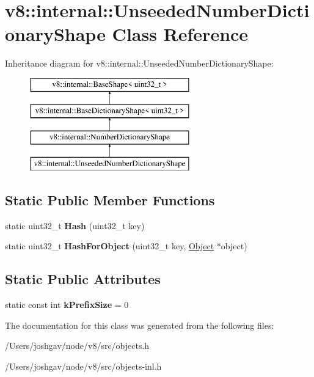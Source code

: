 \hypertarget{classv8_1_1internal_1_1_unseeded_number_dictionary_shape}{}\section{v8\+:\+:internal\+:\+:Unseeded\+Number\+Dictionary\+Shape Class Reference}
\label{classv8_1_1internal_1_1_unseeded_number_dictionary_shape}
Inheritance diagram for v8\+:\+:internal\+:\+:Unseeded\+Number\+Dictionary\+Shape\+:\begin{figure}[H]
\begin{center}
\leavevmode
\includegraphics[height=4.000000cm]{classv8_1_1internal_1_1_unseeded_number_dictionary_shape}
\end{center}
\end{figure}
\subsection*{Static Public Member Functions}
\begin{DoxyCompactItemize}
\item 
static uint32\+\_\+t {\bfseries Hash} (uint32\+\_\+t key)\hypertarget{classv8_1_1internal_1_1_unseeded_number_dictionary_shape_aa263aeb1e0592f9a83df6b3347adbf03}{}\label{classv8_1_1internal_1_1_unseeded_number_dictionary_shape_aa263aeb1e0592f9a83df6b3347adbf03}

\item 
static uint32\+\_\+t {\bfseries Hash\+For\+Object} (uint32\+\_\+t key, \hyperlink{classv8_1_1internal_1_1_object}{Object} $\ast$object)\hypertarget{classv8_1_1internal_1_1_unseeded_number_dictionary_shape_afdf69967c4a50a70d54b2b767b54fd21}{}\label{classv8_1_1internal_1_1_unseeded_number_dictionary_shape_afdf69967c4a50a70d54b2b767b54fd21}

\end{DoxyCompactItemize}
\subsection*{Static Public Attributes}
\begin{DoxyCompactItemize}
\item 
static const int {\bfseries k\+Prefix\+Size} = 0\hypertarget{classv8_1_1internal_1_1_unseeded_number_dictionary_shape_ab455952f7da70732c8171c1bd70faf27}{}\label{classv8_1_1internal_1_1_unseeded_number_dictionary_shape_ab455952f7da70732c8171c1bd70faf27}

\end{DoxyCompactItemize}


The documentation for this class was generated from the following files\+:\begin{DoxyCompactItemize}
\item 
/\+Users/joshgav/node/v8/src/objects.\+h\item 
/\+Users/joshgav/node/v8/src/objects-\/inl.\+h\end{DoxyCompactItemize}
